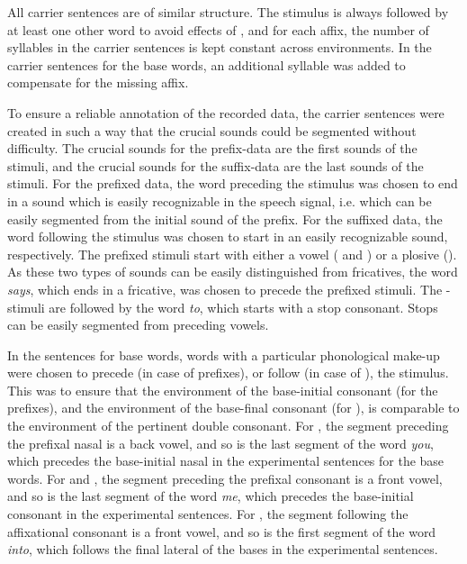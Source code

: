   

All carrier sentences are of similar structure. 
The stimulus is always followed by at least one other word to avoid effects of , and for each affix, the number of syllables in the carrier sentences is kept constant across environments. 
In the carrier sentences for the base words, an additional syllable was added to compensate for the missing affix. 


To ensure a reliable annotation of the recorded data, the carrier sentences were created in such a way that the crucial sounds could be segmented without difficulty. The crucial sounds for the prefix-data are the first sounds of the stimuli, and the crucial sounds for the suffix-data are the last sounds of the stimuli. 
For the prefixed data, the word preceding the stimulus was chosen to end in a sound which is easily recognizable in the speech signal, i.e. which can be easily segmented from the initial sound of the prefix. For the suffixed data, the word following the stimulus was chosen to start in an easily recognizable sound, respectively. 
The prefixed stimuli start with either a vowel ( and ) or a plosive (). As these two types of sounds can be easily distinguished from fricatives,   the word \textit{says}, which ends in a fricative, was chosen to precede the prefixed stimuli. 
The -stimuli are followed by the word \textit{to}, which starts with a stop consonant. Stops can be easily segmented from preceding vowels.  


In the sentences for base words, words with a particular phonological make-up were chosen to precede (in case of prefixes), or follow (in case of ), the stimulus. This was to ensure that the environment of the base-initial consonant (for the prefixes), and the environment of the base-final consonant (for ), is comparable to the environment of the pertinent double consonant.
For , the segment preceding the prefixal nasal is a back vowel, and so is the last segment of the word \textit{you}, which precedes the base-initial nasal in the experimental sentences for the base words. 
For  and , the segment preceding the prefixal consonant is a front vowel, and so is the last segment of the word \textit{me}, which precedes the base-initial consonant in the experimental sentences. 
For , the segment following the affixational consonant is a front vowel, and so is the first segment of the word \textit{into}, which follows the final lateral of the bases in the experimental sentences. 



